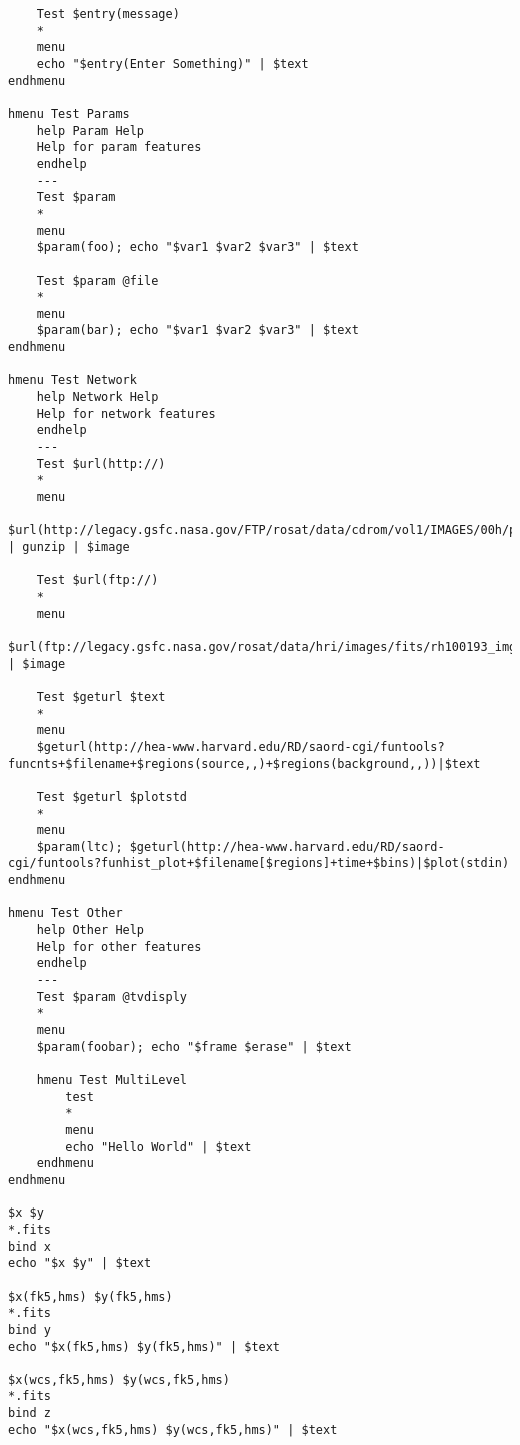 \begin{verbatim}
    Test $entry(message)
    *
    menu
    echo "$entry(Enter Something)" | $text
endhmenu

hmenu Test Params
    help Param Help
    Help for param features
    endhelp
    ---
    Test $param
    *
    menu
    $param(foo); echo "$var1 $var2 $var3" | $text

    Test $param @file
    *
    menu
    $param(bar); echo "$var1 $var2 $var3" | $text
endhmenu

hmenu Test Network
    help Network Help
    Help for network features
    endhelp
    ---
    Test $url(http://)
    *
    menu
    $url(http://legacy.gsfc.nasa.gov/FTP/rosat/data/cdrom/vol1/IMAGES/00h/p000s26b.img.Z) | gunzip | $image

    Test $url(ftp://)
    *
    menu
    $url(ftp://legacy.gsfc.nasa.gov/rosat/data/hri/images/fits/rh100193_img.fits) | $image

    Test $geturl $text
    *
    menu
    $geturl(http://hea-www.harvard.edu/RD/saord-cgi/funtools?funcnts+$filename+$regions(source,,)+$regions(background,,))|$text

    Test $geturl $plotstd
    *
    menu
    $param(ltc); $geturl(http://hea-www.harvard.edu/RD/saord-cgi/funtools?funhist_plot+$filename[$regions]+time+$bins)|$plot(stdin)
endhmenu

hmenu Test Other
    help Other Help
    Help for other features
    endhelp
    ---
    Test $param @tvdisply
    *
    menu
    $param(foobar); echo "$frame $erase" | $text

    hmenu Test MultiLevel
        test
        *
        menu
        echo "Hello World" | $text
    endhmenu
endhmenu

$x $y
*.fits
bind x
echo "$x $y" | $text

$x(fk5,hms) $y(fk5,hms)
*.fits
bind y
echo "$x(fk5,hms) $y(fk5,hms)" | $text

$x(wcs,fk5,hms) $y(wcs,fk5,hms)
*.fits
bind z
echo "$x(wcs,fk5,hms) $y(wcs,fk5,hms)" | $text

\end{verbatim}
\endgroup
